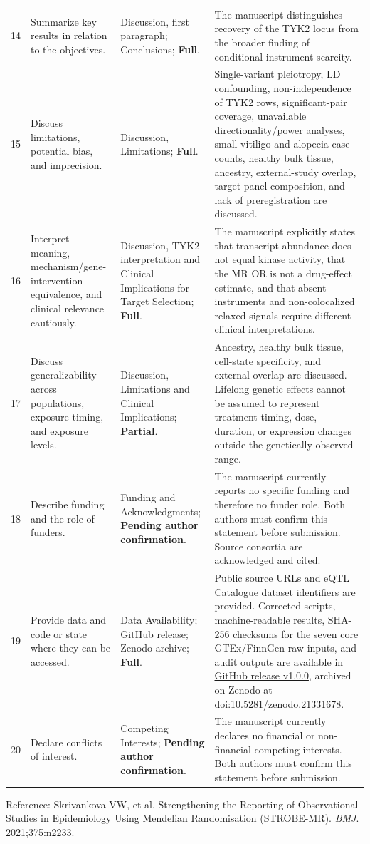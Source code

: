 \documentclass[10pt,a4paper,landscape]{article}
\begin{document}
\begin{longtable}{L{0.8cm}L{5.4cm}L{7.0cm}L{11.0cm}}
14 & Summarize key results in relation to the objectives. & Discussion, first paragraph; Conclusions; \textbf{Full}. & The manuscript distinguishes recovery of the TYK2 locus from the broader finding of conditional instrument scarcity. \\

15 & Discuss limitations, potential bias, and imprecision. & Discussion, Limitations; \textbf{Full}. & Single-variant pleiotropy, LD confounding, non-independence of TYK2 rows, significant-pair coverage, unavailable directionality/power analyses, small vitiligo and alopecia case counts, healthy bulk tissue, ancestry, external-study overlap, target-panel composition, and lack of preregistration are discussed. \\

16 & Interpret meaning, mechanism/gene-intervention equivalence, and clinical relevance cautiously. & Discussion, TYK2 interpretation and Clinical Implications for Target Selection; \textbf{Full}. & The manuscript explicitly states that transcript abundance does not equal kinase activity, that the MR OR is not a drug-effect estimate, and that absent instruments and non-colocalized relaxed signals require different clinical interpretations. \\

17 & Discuss generalizability across populations, exposure timing, and exposure levels. & Discussion, Limitations and Clinical Implications; \textbf{Partial}. & Ancestry, healthy bulk tissue, cell-state specificity, and external overlap are discussed. Lifelong genetic effects cannot be assumed to represent treatment timing, dose, duration, or expression changes outside the genetically observed range. \\

18 & Describe funding and the role of funders. & Funding and Acknowledgments; \textbf{Pending author confirmation}. & The manuscript currently reports no specific funding and therefore no funder role. Both authors must confirm this statement before submission. Source consortia are acknowledged and cited. \\

19 & Provide data and code or state where they can be accessed. & Data Availability; GitHub release; Zenodo archive; \textbf{Full}. & Public source URLs and eQTL Catalogue dataset identifiers are provided. Corrected scripts, machine-readable results, SHA-256 checksums for the seven core GTEx/FinnGen raw inputs, and audit outputs are available in \href{https://github.com/muhaoyang0616/skin_drug_target_mr/releases/tag/v1.0.0}{GitHub release v1.0.0}, archived on Zenodo at \href{https://doi.org/10.5281/zenodo.21331678}{doi:10.5281/zenodo.21331678}. \\

20 & Declare conflicts of interest. & Competing Interests; \textbf{Pending author confirmation}. & The manuscript currently declares no financial or non-financial competing interests. Both authors must confirm this statement before submission. \\

\end{longtable}

\noindent\footnotesize Reference: Skrivankova VW, et al. Strengthening the Reporting of Observational Studies in Epidemiology Using Mendelian Randomisation (STROBE-MR). \textit{BMJ}. 2021;375:n2233.
\end{document}
